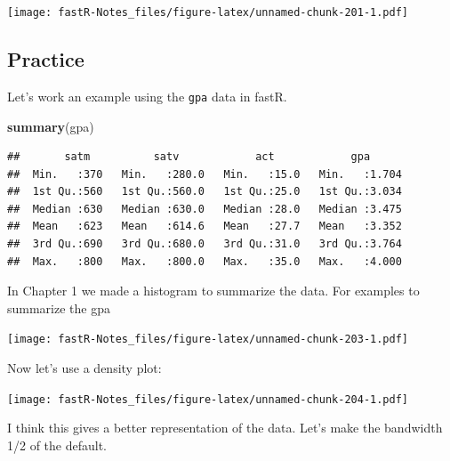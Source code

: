 \documentclass[]{book}
\newenvironment{Shaded}{\begin{snugshade}}{\end{snugshade}}
\newcommand{\KeywordTok}[1]{\textcolor[rgb]{0.13,0.29,0.53}{\textbf{#1}}}
\newcommand{\DataTypeTok}[1]{\textcolor[rgb]{0.13,0.29,0.53}{#1}}
\newcommand{\StringTok}[1]{\textcolor[rgb]{0.31,0.60,0.02}{#1}}
\newcommand{\OperatorTok}[1]{\textcolor[rgb]{0.81,0.36,0.00}{\textbf{#1}}}
\newcommand{\NormalTok}[1]{#1}
\theoremstyle{definition}
\theoremstyle{definition}
\theoremstyle{definition}
\theoremstyle{remark}
\begin{document}
\texttt{[image: fastR-Notes\_files/figure-latex/unnamed-chunk-201-1.pdf]}

\subsection{Practice}\label{practice-4}

Let's work an example using the \texttt{gpa} data in fastR.

\begin{Shaded}
\begin{Highlighting}[]
\KeywordTok{summary}\NormalTok{(gpa)}
\end{Highlighting}
\end{Shaded}

\begin{verbatim}
##       satm          satv            act            gpa       
##  Min.   :370   Min.   :280.0   Min.   :15.0   Min.   :1.704  
##  1st Qu.:560   1st Qu.:560.0   1st Qu.:25.0   1st Qu.:3.034  
##  Median :630   Median :630.0   Median :28.0   Median :3.475  
##  Mean   :623   Mean   :614.6   Mean   :27.7   Mean   :3.352  
##  3rd Qu.:690   3rd Qu.:680.0   3rd Qu.:31.0   3rd Qu.:3.764  
##  Max.   :800   Max.   :800.0   Max.   :35.0   Max.   :4.000
\end{verbatim}

In Chapter 1 we made a histogram to summarize the data. For examples to
summarize the gpa

\begin{Shaded}
\end{Shaded}

\texttt{[image: fastR-Notes\_files/figure-latex/unnamed-chunk-203-1.pdf]}

Now let's use a density plot:

\begin{Shaded}
\end{Shaded}

\texttt{[image: fastR-Notes\_files/figure-latex/unnamed-chunk-204-1.pdf]}

I think this gives a better representation of the data. Let's make the
bandwidth 1/2 of the default.
\end{document}
